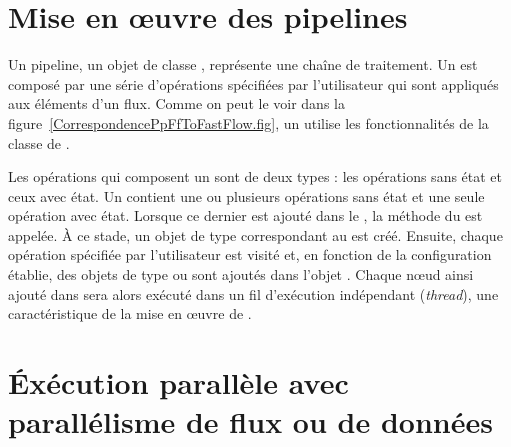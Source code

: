 



\section{Mise en \oe{}uvre des pipelines}

Un pipeline, un objet de classe , repr\'esente une cha\^ine de traitement. Un  est compos\'e par une s\'erie d'op\'erations sp\'ecifi\'ees par l'utilisateur qui sont appliqu\'es aux \'el\'ements d'un flux. Comme on peut le voir dans la figure~\ref{CorrespondencePpFfToFastFlow.fig}, un  utilise les fonctionnalit\'es de la classe  de . 

Les op\'erations qui composent un  sont de deux types : les op\'erations sans \'etat et ceux avec \'etat. Un  contient une ou plusieurs op\'erations sans \'etat et une seule op\'eration avec \'etat. Lorsque ce dernier est ajout\'e dans le , la m\'ethode  du  est appel\'ee. \`A ce stade, un objet de type  correspondant au  est cr\'e\'e. Ensuite, chaque op\'eration sp\'ecifi\'ee par l'utilisateur est visit\'e et, en fonction de la configuration \'etablie, des objets de type  ou  sont ajout\'es dans l'objet . Chaque nœud ainsi ajout\'e dans  sera alors ex\'ecut\'e dans un fil d'ex\'ecution ind\'ependant (\emph{thread}), une caract\'eristique de la mise en \oe{}uvre de .


\section{\'Ex\'ecution parall\`ele avec parall\'elisme de flux ou de donn\'ees}

